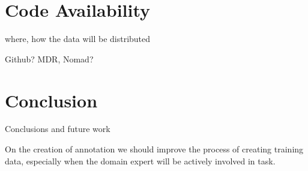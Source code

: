 \documentclass[a4paper,10pt]{article}
\begin{document}
\section{Code Availability}
where, how the data will be distributed 

Github? MDR, Nomad? 


\section{Conclusion}
Conclusions and future work 

On the creation of annotation we should improve the process of creating training data, especially when the domain expert will be actively involved in task. 


  
\end{document}
